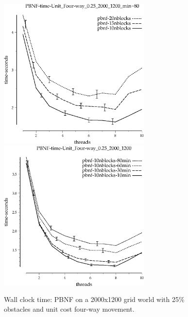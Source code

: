 \documentclass{article}
\begin{document}
\begin{appendices}
\begin{figure}[h]
\begin{center}
\includegraphics[width=3in]{../graphs/grid_unit_four-way_0.25_2000_1200/PBNF-time-Unit_Four-way_0.25_2000_1200_min=80.eps}
\includegraphics[width=3in]{../graphs/grid_unit_four-way_0.25_2000_1200/PBNF-time-Unit_Four-way_0.25_2000_1200.eps}
\caption{Wall clock time: PBNF on a 2000x1200 grid world with 25\%
  obstacles and unit cost four-way movement.}
\end{center}
\end{figure}


\end{appendices}
\end{document}
